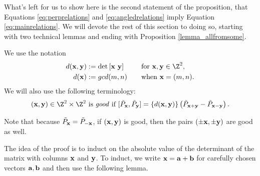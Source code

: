 What's left for us to show here is the second statement of the proposition, that Equations \eqref{eq:perprelations} and \eqref{eq:angledrelations} imply Equation \eqref{eq:mainrelations}. We will devote the rest of this section to doing so, starting with two technical lemmas and ending with Proposition \ref{lemma_allfromsome}. 

We use the notation
\begin{align*} 
d(\xx, \yy) &:= \det\left[\xx\,\, \yy\right] \quad \quad \,\,  \textrm{for } \xx, \yy \in \Z^2, \\
d(\xx) &:= gcd(m,n) \quad \quad \textrm{when } \xx = (m,n).
\end{align*} 
We will also use the following terminology: 
\[
(\xx,\yy) \in \Z^2 \times \Z^2 \textrm{ is \emph{good} if  } [\tilde{P}_\xx,\tilde{P}_\yy] = \{d(\xx,\yy)\} \left( \tilde{P}_{\xx+\yy}-\tilde{P}_{\xx-\yy} \right).
\]

\begin{remark}\label{remark_goodsymmetry}
Note that because $\tilde{P}_{{\mathbf{x}}}=\tilde{P}_{-{\mathbf{x}}}$, if $({\mathbf{x}}, {\mathbf{y}})$ is good, then the pairs $(\pm{\mathbf{x}}, \pm{\mathbf{y}})$ are good as well. 
\end{remark}

The idea of the proof is to induct on the absolute value of the determinant of the matrix with columns ${\mathbf{x}}$ and ${\mathbf{y}}$. To induct, we write ${\mathbf{x}} = {\mathbf{a}} + {\mathbf{b}}$ for carefully chosen vectors ${\mathbf{a}}, {\mathbf{b}}$ and then use the following lemma. 

